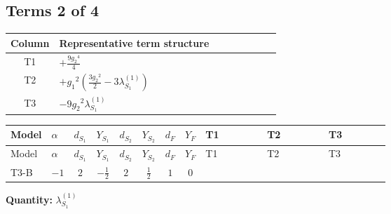 \documentclass[8pt]{article}
\begin{document}
\begin{landscape}
\subsection*{Terms 2 of 4}
\begin{center}
\begin{tabular}{@{}c >{\raggedright\arraybackslash}p{0.82\linewidth}@{}}
\toprule
Column & Representative term structure \\
\midrule
T1 & \(\displaystyle +\frac{9 {g_2}^4}{4}\) \\
\midrule
T2 & \(\displaystyle +{g_1}^2 \left(\frac{3 {g_2}^2}{2}-3 {\lambda_{S_1}^{(1)}}\right)\) \\
\midrule
T3 & \(\displaystyle -9 {g_2}^2 {\lambda_{S_1}^{(1)}}\) \\
\midrule
\bottomrule
\end{tabular}
\end{center}
\smallskip
\tiny
\begin{longtable}{@{}llcccccc >{\raggedright\arraybackslash}p{0.21\linewidth} >{\raggedright\arraybackslash}p{0.21\linewidth} >{\raggedright\arraybackslash}p{0.21\linewidth}@{}}
\toprule
Model & $\alpha$ & $d_{S_1}$ & $Y_{S_1}$ & $d_{S_2}$ & $Y_{S_2}$ & $d_F$ & $Y_F$ & T1 & T2 & T3 \\
\midrule
\endfirsthead
\toprule
Model & $\alpha$ & $d_{S_1}$ & $Y_{S_1}$ & $d_{S_2}$ & $Y_{S_2}$ & $d_F$ & $Y_F$ & T1 & T2 & T3 \\
\midrule
\endhead
T3-B & $-1$ & $2$ & $-\frac{1}{2}$ & $2$ & $\frac{1}{2}$ & $1$ & $0$ & \scriptsize\adjustbox{max width=\linewidth}{$\begin{gathered} +\frac{9 {g_2}^4}{4}\end{gathered}$} & \scriptsize\adjustbox{max width=\linewidth}{$\begin{gathered} +{g_1}^2 \left(\frac{3 {g_2}^2}{2}-3 {\lambda_{S_1}^{(1)}}\right)\end{gathered}$} & \scriptsize\adjustbox{max width=\linewidth}{$\begin{gathered} -9 {g_2}^2 {\lambda_{S_1}^{(1)}}\end{gathered}$} \\
\midrule
\bottomrule
\end{longtable}
\clearpage
\noindent\textbf{Quantity: }$\lambda_{S_1}^{(1)}$\par\smallskip

\end{landscape}
\end{document}
